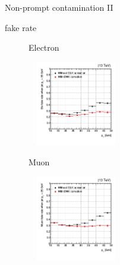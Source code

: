 \documentclass[8pt]{beamer}
\begin{document}
\begin{frame}{Non-prompt contamination II}
\justifying
\begin{block}{ fake rate}\end{block}
\vspace{-15pt}
\begin{figure}[htbp]
\begin{center}
\begin{minipage}[b]{.49\textwidth}
\begin{block}{\centering Electron}\end{block}
\begin{center}
\includegraphics[width=4.2cm, height=3.7cm]{figs/Ele_FR_pt_35GeV_2016.png}
\end{center}
\end{minipage} \hfill
\begin{minipage}[b]{.49\textwidth}
\begin{block}{\centering Muon}\end{block}
\begin{center}
\includegraphics[width=4.2cm, height=3.7cm]{figs/Muon_FR_pt_25GeV_2016.png}
\end{center}
\end{minipage} \hfill
\end{center}
\end{figure} \vfill


\end{frame}
\end{document}
